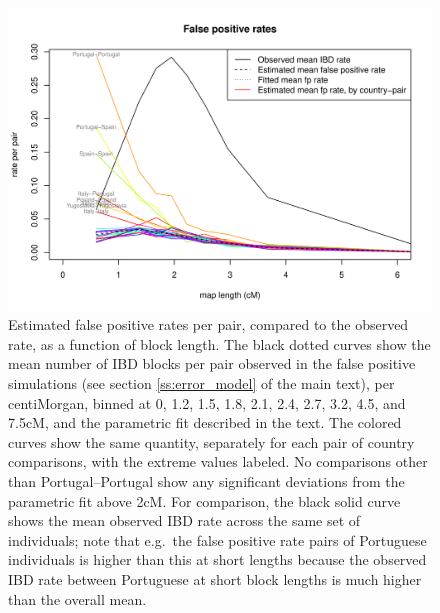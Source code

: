 \documentclass{article}
\begin{document}
\begin{figure}[!htp]
  \begin{center}
    \includegraphics[width=\textwidth]{false-pos-and-true-rate}
    \caption{
    Estimated false positive rates per pair, compared to the observed rate, as a function of block length.
    The black dotted curves show the mean number of IBD blocks per pair observed in the false positive simulations (see section \ref{ss:error_model} of the main text),
    per centiMorgan, binned at 0, 1.2, 1.5, 1.8, 2.1, 2.4, 2.7, 3.2, 4.5, and 7.5cM,
    and the parametric fit described in the text.
    The colored curves show the same quantity, separately for each pair of country comparisons, 
    with the extreme values labeled.
    No comparisons other than Portugal--Portugal show any significant deviations from the parametric fit above 2cM.
    For comparison, the black solid curve shows the mean observed IBD rate across the same set of individuals;
    note that e.g.\ the false positive rate pairs of Portuguese individuals is higher than this at short lengths
    because the observed IBD rate between Portuguese at short block lengths is much higher than the overall mean.
    \label{sfig:fp_rate_by_country}
    }
  \end{center}
\end{figure}
\end{document}

